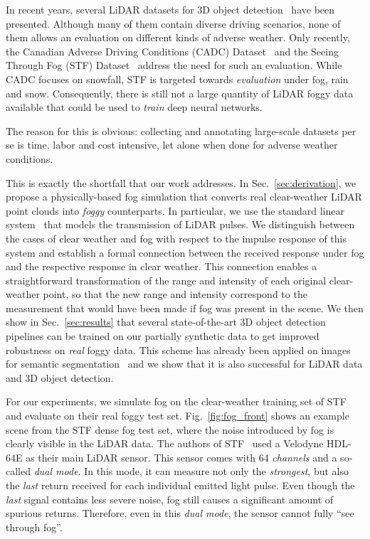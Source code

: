 \documentclass[10pt,twocolumn,letterpaper]{article}
\begin{document}
In recent years, several LiDAR datasets for 3D object detection~\cite{KITTI, nuscenes2019, lyft2019, Argoverse, WaymoOD, Honda3D, A2D2, Apollo} have been presented. Although many of them contain diverse driving scenarios, none of them allows an evaluation on different kinds of adverse weather. Only recently, the Canadian Adverse Driving Conditions (CADC) Dataset~\cite{CADC} and the Seeing Through Fog (STF) Dataset~\cite{STF} address the need for such an evaluation. While CADC focuses on snowfall, STF is targeted towards \textit{evaluation} under fog, rain and snow. Consequently, there is still not a large quantity of LiDAR foggy data available that could be used to \textit{train} deep neural networks. 

The reason for this is obvious: collecting and annotating large-scale datasets per se is time, labor and cost intensive, let alone when done for adverse weather conditions.

This is exactly the shortfall that our work addresses. In Sec.~\ref{sec:derivation}, we propose a physically-based fog simulation that converts real clear-weather LiDAR point clouds into \textit{foggy} counterparts. In particular, we use the standard linear system~\cite{Rasshofer_2011} that models the transmission of LiDAR pulses. We distinguish between the cases of clear weather and fog with respect to the impulse response of this system and establish a formal connection between the received response under fog and the respective response in clear weather. This connection enables a straightforward transformation of the range and intensity of each original clear-weather point, so that the new range and intensity correspond to the measurement that would have been made if fog was present in the scene. We then show in Sec.~\ref{sec:results} that several state-of-the-art 3D object detection pipelines can be trained on our partially synthetic data to get improved robustness on \textit{real} foggy data. This scheme has already been applied on images for semantic segmentation~\cite{SDV18, SynRealDataFogECCV18, FoggySynscapes} and we show that it is also successful for LiDAR data and 3D object detection. 

For our experiments, we simulate fog on the clear-weather training set of STF~\cite{STF} and evaluate on their real foggy test set. Fig.~\ref{fig:fog_front} shows an example scene from the STF dense fog test set, where the noise introduced by fog is clearly visible in the LiDAR data. The authors of STF~\cite{STF} used a Velodyne HDL-64E as their main LiDAR sensor. This sensor comes with 64 \textit{channels} and a so-called \textit{dual mode}. In this mode, it can measure not only the \textit{strongest}, but also the \textit{last} return received for each individual emitted light pulse. 
Even though the \textit{last} signal contains less severe noise, fog still causes a significant amount of spurious returns. Therefore, even in this \textit{dual mode}, the sensor cannot fully ``see through fog''.
\end{document}
